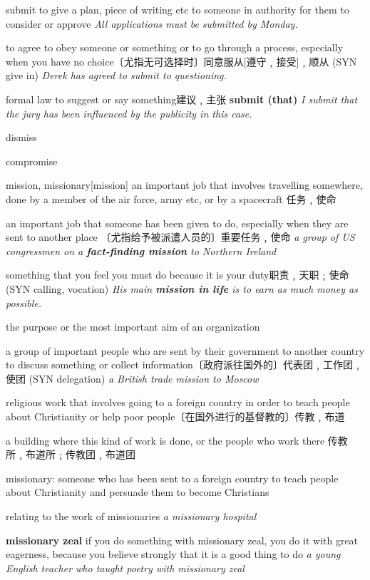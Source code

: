 \begin{DefWord}{submit}
    to give a plan, piece of writing etc to someone in authority for them to consider or approve
    \textit{All applications must be submitted by Monday.}

    to agree to obey someone or something or to go through a process, especially when you have no choice〔尤指无可选择时〕同意服从[遵守﹐接受]﹐顺从 (SYN  give in)
    \textit{Derek has agreed to submit to questioning.}

    formal law to suggest or say something建议﹐主张
    \textbf{submit (that)}
    \textit{I submit that the jury has been influenced by the publicity in this case.}
\end{DefWord}

\begin{DefWord}{dismiss}
\end{DefWord}

\begin{DefWord}{compromise}
\end{DefWord}

\begin{DefWord}{mission, missionary}[mission]
    an important job that involves travelling somewhere, done by a member of the air force, army etc, or by a spacecraft 任务﹐使命

    an important job that someone has been given to do, especially when they are sent to another place 〔尤指给予被派遣人员的〕重要任务﹐使命
    \textit{a group of US congressmen on a \textbf{fact-finding mission} to Northern Ireland}

    something that you feel you must do because it is your duty职责﹐天职﹔使命 (SYN  calling, vocation)
    \textit{His main \textbf{mission in life} is to earn as much money as possible.}

    the purpose or the most important aim of an organization

    a group of important people who are sent by their government to another country to discuss something or collect information〔政府派往国外的〕代表团﹐工作团﹐使团 (SYN  delegation)
    \textit{a British trade mission to Moscow}

    religious work that involves going to a foreign country in order to teach people about Christianity or help poor people〔在国外进行的基督教的〕传教﹐布道

    a building where this kind of work is done, or the people who work there 传教所﹐布道所﹔传教团﹐布道团

    missionary: someone who has been sent to a foreign country to teach people about Christianity and persuade them to become Christians

    relating to the work of missionaries
    \textit{a missionary hospital}

    \textbf{missionary zeal} if you do something with missionary zeal, you do it with great eagerness, because you believe strongly that it is a good thing to do
    \textit{a young English teacher who taught poetry with missionary zeal}
\end{DefWord}

